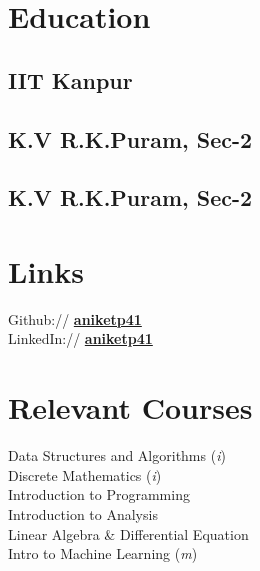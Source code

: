 \documentclass[]{deedy-resume-openfont}
\begin{document}
\begin{minipage}[t]{0.33\textwidth} 


\section{Education} 

\subsection{IIT Kanpur}
\sectionsep{}

\subsection{K.V R.K.Puram, Sec-2}
\sectionsep{}

\subsection{K.V R.K.Puram, Sec-2}


\section{Links} 
Github:// \href{https://github.com/aniketp41}{\bf aniketp41} \\
LinkedIn://  \href{https://www.linkedin.com/in/aniketp41}{\bf aniketp41} \\



\section{Relevant Courses}
Data Structures and Algorithms (\textit{i}) \\
Discrete Mathematics (\textit{i}) \\
Introduction to Programming \\
Introduction to Analysis \\
Linear Algebra \& Differential Equation \\
Intro to Machine Learning (\textit{m})


\end{minipage}
\end{document}
